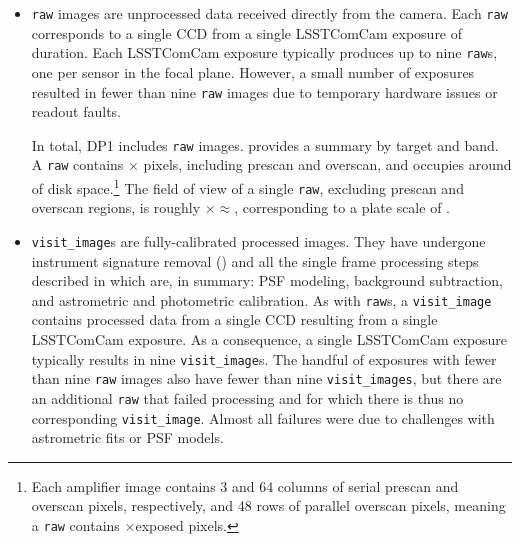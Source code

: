 \begin{itemize}
\item \texttt{raw} images are unprocessed data received directly from the \gls{camera}.
Each \texttt{raw} corresponds to a single CCD from a single \gls{LSSTComCam} exposure of \exposuretime duration.
Each \gls{LSSTComCam} exposure typically produces up to nine \texttt{raw}s, one per sensor in the focal plane.
However, a small number of exposures resulted in fewer than nine \texttt{raw} images due to temporary hardware issues or readout faults.

In total, \gls{DP1} includes \nraws \texttt{raw} images.
 provides a summary by target and band.
A \texttt{raw} contains \nrawpixx $\times$ \nrawpixy pixels, including prescan and overscan, and occupies around \rawhdd of disk space.\footnote{Each amplifier image contains 3 and 64 columns of serial prescan and overscan pixels, respectively, and 48 rows of parallel overscan pixels, meaning a \texttt{raw} contains \nvisitimagepixx$\times$\nvisitimagepixy exposed pixels.}
The field of view of a single \texttt{raw}, excluding prescan and overscan regions, is roughly \visitimagefovx$\times$\visitimagefovy$\approx$\visitimagefov, corresponding to a plate scale of \rawplatescale.






\item \texttt{visit\_image}s are fully-calibrated processed images.
They have undergone instrument signature removal () and all the single frame processing steps described in  which are, in summary: PSF modeling, background subtraction, and astrometric and photometric \gls{calibration}.
As with \texttt{raw}s, a \texttt{visit\_image} contains processed data from a single CCD resulting from a single \exposuretime \gls{LSSTComCam} exposure.
As a consequence, a single \gls{LSSTComCam} exposure typically results in nine \texttt{visit\_image}s.
The handful of exposures with fewer than nine \texttt{raw} images also have fewer than nine \texttt{visit\_images}, but there are an additional \nsfpfails \texttt{raw} that failed processing and for which there is thus no corresponding \texttt{visit\_image}. Almost all failures were due to challenges with astrometric fits or \gls{PSF} models.


\end{itemize}
